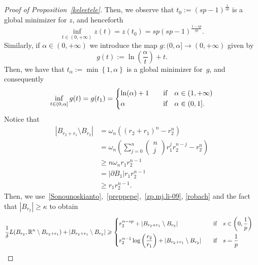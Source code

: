 \documentclass[12pt]{article}
\newcommand{\R}{\mathbb{R}}
\numberwithin{equation}{section}
\renewcommand{\geq}{\geqslant}
\begin{document}
\begin{proof}[Proof of Proposition~\ref{keleetele}]
Then, we observe that $t_0:=(sp-1)^\frac{1}{sp}$ is a global minimizer for $z$, and henceforth
\begin{equation}\label{preppepe}
\inf_{t\in (0,+\infty)}z(t)= z(t_0)=sp(sp-1)^{\frac{1-sp}{sp}}.
\end{equation} 
Similarly, if $\alpha\in (0,+\infty)$ we introduce the map $g:(0,\alpha]\to (0,+\infty)$ given by 
\begin{equation*}
g(t):=\ln \left(\frac{\alpha}{t}\right)+t.
\end{equation*} 
Then, we have that $t_\alpha:=\min\left\lbrace 1,\alpha\right\rbrace$ is a global minimizer for~$g$, and consequently 
\begin{equation}\label{zp.mj.li-09}
\inf_{t\in (0,\alpha]}g(t)=g(t_1)=\begin{dcases}
\ln(\alpha)+1\quad &\mbox{if}\quad \alpha\in (1,+\infty)\\
\alpha \quad &\mbox{if}\quad \alpha\in (0,1]. 
\end{dcases} 
\end{equation} 
Notice that 
\begin{equation}\label{robach}
\begin{split}
\left|B_{r_2+r_1}\setminus B_{r_2}\right|&=\omega_n\left((r_2+r_1)^n-r_2^n\right)\\
&=\omega_n\left(\sum_{j=0}^n\begin{pmatrix} n\\j \end{pmatrix} r_1^j r_2^{n-j}-r_2^n\right)\\
&\geq n \omega_n r_1 r_2^{n-1}\\
&=\left|\partial B_1\right| r_1 r_2^{n-1}\\
&\geq r_1 r_2^{n-1}.    
\end{split}
\end{equation}
Then,  we use~\eqref{Sonounoskianto},~\eqref{preppepe},~\eqref{zp.mj.li-09}, \eqref{robach} and the fact that $\left|B_{r_2}\right|\geq \kappa$ to obtain  
\begin{equation}\label{phjh}
\begin{split}
\frac{1}{\delta}L(B_{r_2},\R^n\setminus B_{r_2+r_1})+\left|B_{r_2+r_1}\setminus B_{r_2}\right| &\geq \begin{dcases}
r_2^{n-sp} +\left|B_{r_2+r_1}\setminus B_{r_2}\right|\quad &\mbox{if}\quad s\in \left(0,\frac{1}{p}\right)\\
r_2^{n-1}\log\left(\frac{r_2}{r_1}\right)+\left|B_{r_2+r_1}\setminus B_{r_2}\right|\quad &\mbox{if}\quad s=\frac{1}{p}\\

\end{dcases}
\end{split}
\end{equation}
\end{proof}
\end{document}
